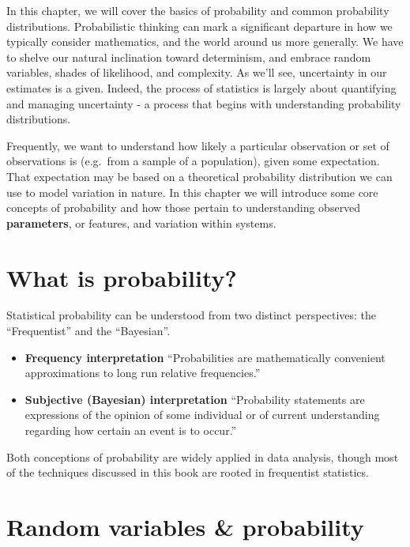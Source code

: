 \documentclass[]{book}
\providecommand{\tightlist}{%
  \setlength{\itemsep}{0pt}\setlength{\parskip}{0pt}}
\begin{document}
In this chapter, we will cover the basics of probability and common probability distributions. Probabilistic thinking can mark a significant departure in how we typically consider mathematics, and the world around us more generally. We have to shelve our natural inclination toward determinism, and embrace random variables, shades of likelihood, and complexity. As we'll see, uncertainty in our estimates is a given. Indeed, the process of statistics is largely about quantifying and managing uncertainty - a process that begins with understanding probability distributions.

Frequently, we want to understand how likely a particular observation or set of observations is (e.g.~from a sample of a population), given some expectation. That expectation may be based on a theoretical probability distribution we can use to model variation in nature. In this chapter we will introduce some core concepts of probability and how those pertain to understanding observed \textbf{parameters}, or features, and variation within systems.

\hypertarget{what-is-probability}{%
\section{What is probability?}\label{what-is-probability}}

Statistical probability can be understood from two distinct perspectives: the ``Frequentist'' and the ``Bayesian''.

\begin{itemize}
\tightlist
\item
  \textbf{Frequency interpretation}
  ``Probabilities are mathematically convenient approximations to long run relative frequencies.''
\item
  \textbf{Subjective (Bayesian) interpretation}
  ``Probability statements are expressions of the opinion of some individual or of current understanding regarding how certain an event is to occur.''
\end{itemize}

Both conceptions of probability are widely applied in data analysis, though most of the techniques discussed in this book are rooted in frequentist statistics.

\hypertarget{random-variables-probability}{%
\section{Random variables \& probability}\label{random-variables-probability}}
\end{document}
